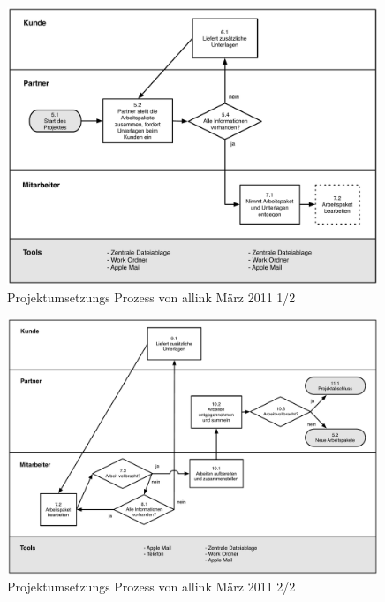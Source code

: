 \begin{figure}[htbp]
\begin{center}
\includegraphics[width=0.99\textwidth,angle=0]{./bilder/02_ist_prozesse_arbeit_01.pdf}
\caption{Projektumsetzungs Prozess von allink März 2011 1/2}
\label{pic:02_ist_prozesse_arbeit_01}
\end{center}
\end{figure}

\begin{figure}[htbp]
\begin{center}
\includegraphics[width=0.99\textwidth,angle=0]{./bilder/02_ist_prozesse_arbeit_02.pdf}
\caption{Projektumsetzungs Prozess von allink März 2011 2/2}
\label{pic:02_ist_prozesse_arbeit_02}
\end{center}
\end{figure}

